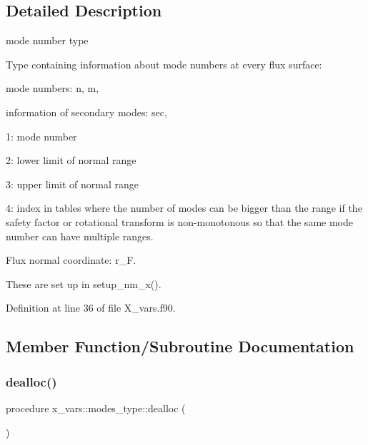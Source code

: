 \subsection{Detailed Description}
mode number type 

Type containing information about mode numbers at every flux surface\+:
\begin{DoxyItemize}
\item mode numbers\+: {\ttfamily n}, {\ttfamily m},
\item information of secondary modes\+: {\ttfamily sec},
\begin{DoxyItemize}
\item 1\+: mode number
\item 2\+: lower limit of normal range
\item 3\+: upper limit of normal range
\item 4\+: index in tables where the number of modes can be bigger than the range if the safety factor or rotational transform is non-\/monotonous so that the same mode number can have multiple ranges.
\end{DoxyItemize}
\item Flux normal coordinate\+: {\ttfamily r\+\_\+F}.
\end{DoxyItemize}

These are set up in setup\+\_\+nm\+\_\+x(). 

Definition at line 36 of file X\+\_\+vars.\+f90.



\subsection{Member Function/\+Subroutine Documentation}
\mbox{\label{structx__vars_1_1modes__type_a7e5a5911553ebec13c9b86014be7d78e}} 
\subsubsection{\texorpdfstring{dealloc()}{dealloc()}}
{\footnotesize\ttfamily procedure x\+\_\+vars\+::modes\+\_\+type\+::dealloc (\begin{DoxyParamCaption}{ }\end{DoxyParamCaption})}



